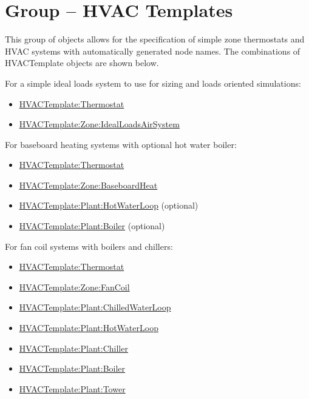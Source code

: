 \section{Group -- HVAC Templates}\label{group-hvac-templates}

This group of objects allows for the specification of simple zone thermostats and HVAC systems with automatically generated node names. The combinations of HVACTemplate objects are shown below.

For a simple ideal loads system to use for sizing and loads oriented simulations:

\begin{itemize}
\item
  \hyperref[hvactemplatethermostat]{HVACTemplate:Thermostat}
\item
  \hyperref[hvactemplatezoneidealloadsairsystem]{HVACTemplate:Zone:IdealLoadsAirSystem}
\end{itemize}

For baseboard heating systems with optional hot water boiler:

\begin{itemize}
\item
  \hyperref[hvactemplatethermostat]{HVACTemplate:Thermostat}
\item
  \hyperref[hvactemplatezonebaseboardheat]{HVACTemplate:Zone:BaseboardHeat}
\item
  \hyperref[hvactemplateplanthotwaterloop]{HVACTemplate:Plant:HotWaterLoop} (optional)
\item
  \hyperref[hvactemplateplantboiler]{HVACTemplate:Plant:Boiler} (optional)
\end{itemize}

For fan coil systems with boilers and chillers:

\begin{itemize}
\item
  \hyperref[hvactemplatethermostat]{HVACTemplate:Thermostat}
\item
  \hyperref[hvactemplatezonefancoil]{HVACTemplate:Zone:FanCoil}
\item
  \hyperref[hvactemplateplantchilledwaterloop]{HVACTemplate:Plant:ChilledWaterLoop}
\item
  \hyperref[hvactemplateplanthotwaterloop]{HVACTemplate:Plant:HotWaterLoop}
\item
  \hyperref[hvactemplateplantchiller]{HVACTemplate:Plant:Chiller}
\item
  \hyperref[hvactemplateplantboiler]{HVACTemplate:Plant:Boiler}
\item
  \hyperref[hvactemplateplanttower]{HVACTemplate:Plant:Tower}
\end{itemize}

